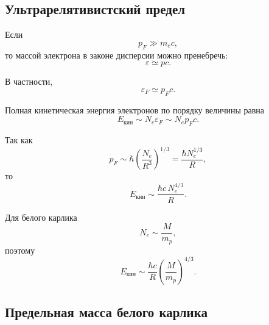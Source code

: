 \documentclass[../final.tex]{subfiles}
\begin{document}

\subsection*{Ультрарелятивистский предел}

Если
%
\begin{equation*}
    p_F
    \gg
    m_ec,
\end{equation*}
%
то массой электрона в законе дисперсии можно пренебречь:
%
\begin{equation*}
    \varepsilon
    \simeq
    pc.
\end{equation*}

В частности,
%
\begin{equation*}
    \varepsilon_F
    \simeq
    p_Fc.
\end{equation*}

Полная кинетическая энергия электронов по порядку величины равна
%
\begin{equation*}
    E_{\text{кин}}
    \sim
    N_e\varepsilon_F
    \sim
    N_ep_Fc.
\end{equation*}

Так как
%
\begin{equation*}
    p_F
    \sim
    \hbar
    \left(
        \frac{N_e}{R^3}
    \right)^{1/3}
    =
    \frac{\hbar N_e^{1/3}}{R},
\end{equation*}
%
то
%
\begin{equation*}
    E_{\text{кин}}
    \sim
    \frac{\hbar c\,N_e^{4/3}}{R}.
\end{equation*}

Для белого карлика
%
\begin{equation*}
    N_e
    \sim
    \frac{M}{m_p},
\end{equation*}
%
поэтому
%
\begin{equation*}
    E_{\text{кин}}
    \sim
    \frac{\hbar c}{R}
    \left(
        \frac{M}{m_p}
    \right)^{4/3}.
\end{equation*}



\subsection*{Предельная масса белого карлика}
\end{document}
